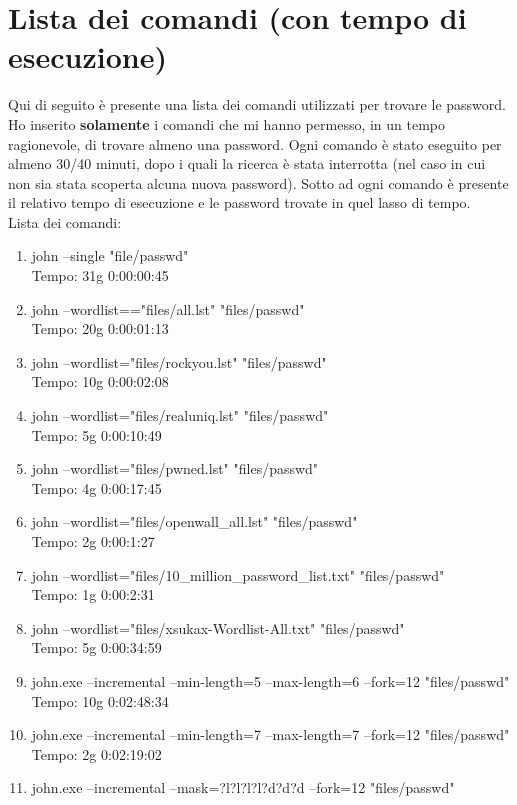 \documentclass[11pt]{article} %
\begin{document}
\section{Lista dei comandi (con tempo di esecuzione)}
Qui di seguito è presente una lista dei comandi utilizzati per trovare le password. Ho inserito \textbf{solamente} i comandi che mi hanno permesso, in un tempo ragionevole, di trovare almeno una password. Ogni comando è stato eseguito per almeno 30/40 minuti, dopo i quali la ricerca è stata interrotta (nel caso in cui non sia stata scoperta alcuna nuova password). Sotto ad ogni comando è presente il relativo tempo di esecuzione e le password trovate in quel lasso di tempo. \\
Lista dei comandi:
\begin{enumerate}
\item{john --single "file/passwd" \\
Tempo: 31g 0:00:00:45}
\item{john --wordlist=="files/all.lst" "files/passwd"\\
Tempo: 20g 0:00:01:13}
\item{john --wordlist="files/rockyou.lst" "files/passwd"\\
Tempo: 10g 0:00:02:08}
\item{john --wordlist="files/realuniq.lst" "files/passwd"\\
Tempo: 5g 0:00:10:49}
\item{john --wordlist="files/pwned.lst" "files/passwd"\\
Tempo: 4g 0:00:17:45}
\item{john --wordlist="files/openwall\_all.lst" "files/passwd"\\
Tempo: 2g 0:00:1:27}
\item{john --wordlist="files/10\_million\_password\_list.txt" "files/passwd"\\
Tempo: 1g 0:00:2:31}
\item{john --wordlist="files/xsukax-Wordlist-All.txt" "files/passwd" \\
Tempo: 5g 0:00:34:59}
\item{john.exe --incremental --min-length=5 --max-length=6 --fork=12 "files/passwd"\\
Tempo: 10g 0:02:48:34}
\item{john.exe --incremental --min-length=7 --max-length=7 --fork=12 "files/passwd"\\
Tempo: 2g 0:02:19:02}
\item{john.exe --incremental --mask=?l?l?l?l?d?d?d --fork=12 "files/passwd"\\
}
\end{enumerate}
\end{document}
